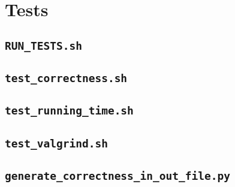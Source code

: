 \documentclass[a4paper,11pt]{kth-mag}
\begin{document}
\section{Tests}
\subsection{\texttt{RUN\_TESTS.sh}}

\subsection{\texttt{test\_correctness.sh}}

\subsection{\texttt{test\_running\_time.sh}}

\subsection{\texttt{test\_valgrind.sh}}

\subsection{\texttt{generate\_correctness\_in\_out\_file.py}}


\clearpage
%
%


\end{document}
